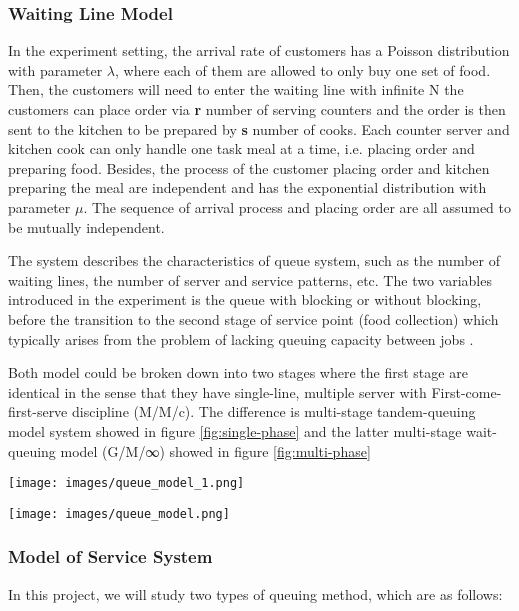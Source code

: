 \subsubsection{Waiting Line Model}
In the experiment setting, the arrival rate of customers has a Poisson distribution with parameter $\lambda$, where each of them are allowed to only buy one set of food. Then, the customers will need to enter the waiting line with infinite N the customers can place order via \textbf{r} number of serving counters and the order is then sent to the kitchen to be prepared by \textbf{s} number of cooks. Each counter server and kitchen cook can only handle one task meal at a time, i.e. placing order and preparing food. Besides, the process of the customer placing order and kitchen preparing the meal are independent and has the exponential distribution with parameter $\mu$. The sequence of arrival process and placing order are all assumed to be mutually independent.

The system describes the characteristics of queue system, such as the number of waiting lines, the number of server and service patterns, etc. The two variables introduced in the experiment is the queue with blocking or without blocking, before the transition to the second stage of service point (food collection) which typically arises from the problem of lacking queuing capacity between jobs \cite{Gomez-Corral2002}.

Both model could be broken down into two stages where the first stage are identical in the sense that they have single-line, multiple server with First-come-first-serve discipline (M/M/c). The difference is multi-stage tandem-queuing model \cite{ross2014introduction} system showed in figure \ref{fig:single-phase}  and the latter  multi-stage wait-queuing model (G/M/∞) \cite{WU2019927} showed in figure \ref{fig:multi-phase}

\noindent
\begin{minipage}{\textwidth}
    \texttt{[image: images/queue\_model\_1.png]}
    \label{fig:single-phase}
\end{minipage}
\begin{minipage}{\textwidth}
    \texttt{[image: images/queue\_model.png]}
    \label{fig:multi-phase}
\end{minipage}
\subsubsection{Model of Service System}
In this project, we will study two types of queuing method, which are as follows:

